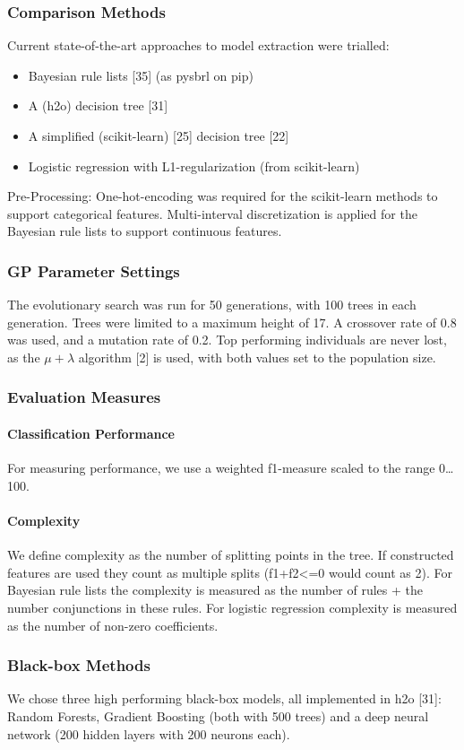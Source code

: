 \subsubsection{Comparison Methods}
Current state-of-the-art approaches to model extraction were trialled:
\begin{itemize}
\item Bayesian rule lists [35] (as pysbrl on pip)
\item A (h2o) decision tree [31]
\item A simplified (scikit-learn) [25] decision tree [22]
\item Logistic regression with L1-regularization (from scikit-learn)
\end{itemize}
Pre-Processing: One-hot-encoding was required for the scikit-learn methods to support categorical features. Multi-interval discretization is applied for the Bayesian rule lists to support continuous features.
\subsubsection{GP Parameter Settings}
The evolutionary search was run for 50 generations, with 100 trees in each generation. Trees were limited to a maximum height of 17. A crossover rate of 0.8 was used, and a mutation rate of 0.2. Top performing individuals are never lost, as the $\mu + \lambda$ algorithm [2] is used, with both values set to the population size.
\subsubsection{Evaluation Measures}
\paragraph{Classification Performance}
For measuring performance, we use a weighted f1-measure scaled to the range 0\ldots100.
\paragraph{Complexity}
We define complexity as the number of splitting points in the tree. If constructed features are used they count as multiple splits (f1+f2<=0 would count as 2). For Bayesian rule lists the complexity is measured as the number of rules + the number conjunctions in these rules. For logistic regression complexity is measured as the number of non-zero coefficients.
\subsubsection{Black-box Methods}
We chose three high performing black-box models, all implemented in h2o [31]: Random Forests, Gradient Boosting (both with 500 trees) and a deep neural network (200 hidden layers with 200 neurons each).


